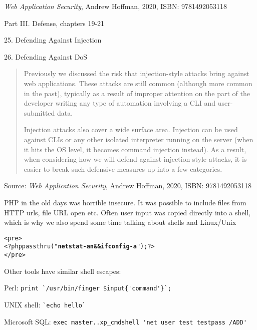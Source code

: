 \documentclass[Screen16to9,17pt]{foils}
\begin{document}
\emph{Web Application Security}, Andrew Hoffman, 2020, ISBN: 9781492053118

\begin{list1}
\item Part III. Defense, chapters 19-21
\item 25. Defending Against Injection
\item 26. Defending Against DoS

\end{list1}





\begin{quote}
Previously we discussed the risk that injection-style attacks bring against web applications. These attacks are still common (although more common in the past), typically as a result of improper attention on the part of the developer writing any type of automation involving a CLI and user-submitted data.

Injection attacks also cover a wide surface area. Injection can be used against CLIs or any other isolated interpreter running on the server (when it hits the OS level, it becomes command injection instead). As a result, when considering how we will defend against injection-style attacks, it is easier to break such defensive measures up into a few categories.
\end{quote}

Source: \emph{Web Application Security}, Andrew Hoffman, 2020, ISBN: 9781492053118


\begin{list1}
\item PHP in the old days was horrible insecure. It was possible to include files from HTTP urls, file URL open etc. Often user input was copied directly into a shell, which is why we also spend some time talking about shells and Linux/Unix
\end{list1}
\begin{alltt}
<pre>
<?php passthru("{\bf netstat -an && ifconfig -a}"); ?>
</pre>
\end{alltt}
\begin{list1}
\item Other tools have similar shell escapes:
\begin{list2}
\item Perl: \verb+print `/usr/bin/finger $input{'command'}`;+
\item UNIX shell: \verb+`echo hello`+
\item Microsoft SQL: \verb+exec master..xp_cmdshell 'net user test testpass /ADD'+
\end{list2}
\end{list1}
\end{document}
